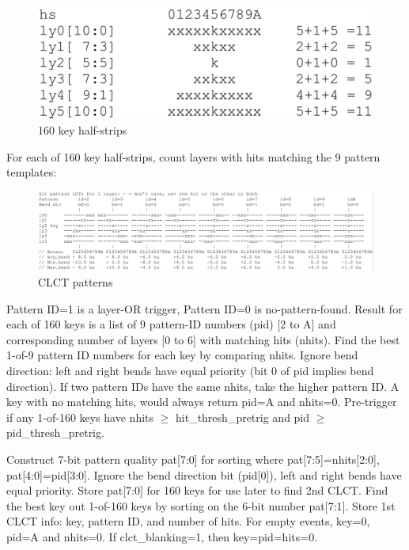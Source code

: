 \begin{figure}[tbh]
        \begin{center}
                \includegraphics[width=0.48\linewidth]{figures/160_key_half_strips.png}
                \caption{160 key half-strips}
                \label{fig:160_key_half_strips}
        \end{center}
\end{figure}

For each of 160 key half-strips, count layers with hits matching the 9 pattern templates:

\begin{figure}[tbh]
        \begin{center}
                \includegraphics[width=0.98\linewidth]{figures/CLCT_patterns.png}
                \caption{CLCT patterns}
                \label{fig:clct_patterns}
        \end{center}
\end{figure}

Pattern ID=1 is a layer-OR trigger, Pattern ID=0 is no-pattern-found. Result for each of 160 keys is a list of 9 pattern-ID numbers (pid) [2 to A] and corresponding
number of layers [0 to 6] with matching hits (nhits). Find the best 1-of-9 pattern ID numbers for each key by comparing nhits. Ignore bend direction: left and right bends have equal priority (bit 0 of pid implies bend direction).
If two pattern IDs have the same nhits, take the higher pattern ID. A key with no matching hits, would always return pid=A and nhits=0.
Pre-trigger if any 1-of-160 keys have nhits $\geq$ hit\_thresh\_pretrig and pid $\geq$ pid\_thresh\_pretrig.

Construct 7-bit pattern quality pat[7:0] for sorting where pat[7:5]=nhits[2:0], pat[4:0]=pid[3:0]. Ignore the bend direction bit (pid[0]), left and right bends have equal priority. 
Store pat[7:0] for 160 keys for use later to find 2nd CLCT.
Find the best key out 1-of-160 keys by sorting on the 6-bit number pat[7:1]. Store 1st CLCT info: key, pattern ID, and number of hits.
For empty events, key=0, pid=A and nhits=0. If clct\_blanking=1, then key=pid=hits=0.

